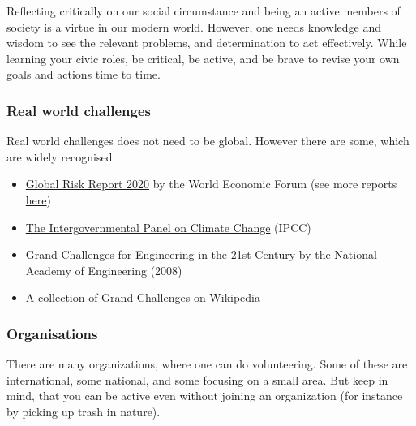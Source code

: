 \documentclass{article}
\begin{document}
Reflecting critically on our social circumstance and being an active members of society is a virtue in our modern world.
However, one needs knowledge and wisdom to see the relevant problems, and determination to act effectively.
While learning your civic roles,
be critical, be active, and be brave to revise your own goals and actions time to time.




\subsubsection{Real world challenges}
Real world challenges does not need to be global. However there are some, which are widely recognised:
\begin{itemize}
    \item \href{https://reports.weforum.org/global-risks-report-2020/}{Global Risk Report 2020} by the World Economic Forum (see more reports \href{https://reports.weforum.org/}{here})
    \item \href{https://www.ipcc.ch/}{The Intergovernmental Panel on Climate Change} (IPCC)
    \item \href{http://www.engineeringchallenges.org/challenges.aspx}{Grand Challenges for Engineering in the 21st Century} by the National Academy of Engineering (2008)
    \item \href{https://en.wikipedia.org/wiki/Grand_Challenges}{A collection of Grand Challenges} on Wikipedia
\end{itemize}

\subsubsection{Organisations}
There are many organizations, where one can do volunteering. Some of these are international, some national, and some focusing on a small area.
But keep in mind, that you can be active even without joining an organization (for instance by picking up trash in nature).
\end{document}
